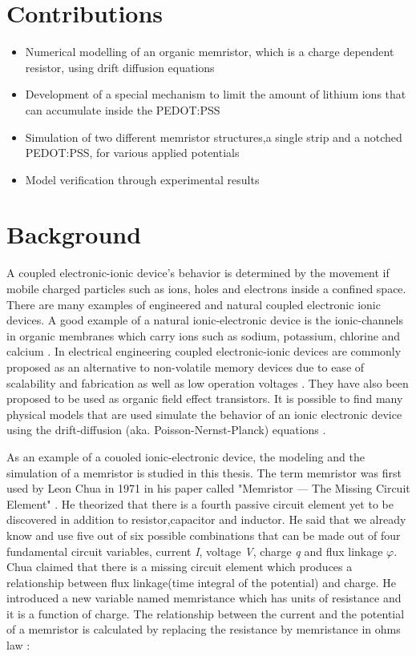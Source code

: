 \begin{doublespace}
\section{Contributions}

\begin{itemize}
  \item Numerical modelling of an organic memristor, which is a charge dependent resistor, using drift diffusion equations  
  \item Development of a special mechanism to limit the amount of lithium ions that can accumulate inside the PEDOT:PSS
  \item Simulation of two different memristor structures,a single strip and a notched PEDOT:PSS, for various applied potentials
  \item Model verification through experimental results 
\end{itemize}

\section{Background}

A coupled electronic-ionic device's behavior is determined by the movement if mobile charged particles such as ions, holes and electrons inside a confined space. There are many examples of engineered and natural coupled electronic ionic devices. A good example of a natural ionic-electronic device is the ionic-channels in organic membranes which carry ions such as sodium, potassium, chlorine and calcium \cite{electrodiff}\cite{GramacidinChannel}. In electrical engineering coupled electronic-ionic devices are commonly proposed as an alternative to non-volatile memory devices due to ease of scalability and fabrication as well as low operation voltages \cite{IonicMemoryDev}\cite{NanoScaleMemEle}. They have also been proposed to be used as organic field effect transistors\cite{OrganicFet}. It is possible to find many physical models that are used simulate the behavior of an ionic electronic device using the drift-diffusion (aka. Poisson-Nernst-Planck) equations \cite{IonicMemoryDev}\cite{OrganicMemSim}\cite{NumericalPNP}.

As an example of a couoled ionic-electronic device, the modeling and the simulation of a memristor is studied in this thesis. The term memristor was first used by Leon Chua in 1971 in his paper called  "Memristor — The Missing Circuit Element" \cite{chua}. He theorized that there is a fourth passive circuit element yet to be discovered in addition to resistor,capacitor and inductor. He said that we already know and use five out of six possible combinations that can be made out of four fundamental circuit variables, current \textit{I}, voltage \textit{V}, charge \textit{q} and flux linkage \textit{$\varphi$}. Chua claimed that there is a missing circuit element which produces a relationship between flux linkage(time integral of the potential) and charge. He introduced a new variable named memristance which has units of resistance and it is a function of charge. The relationship between the current and the potential of a memristor is calculated by replacing the resistance by memristance in ohms law \cite{memristance}:



\end{doublespace}
